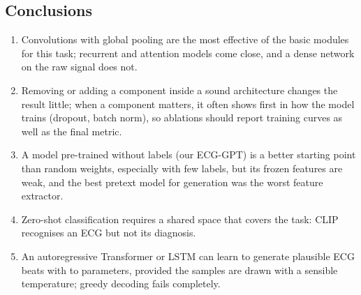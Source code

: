 \subsection{Conclusions}

\begin{enumerate}[leftmargin=1.4em,itemsep=1pt]
  \item Convolutions with global pooling are the most effective of the basic modules for this task;
        recurrent and attention models come close, and a dense network on the raw signal does not.
  \item Removing or adding a component inside a sound architecture changes the result little; when a
        component matters, it often shows first in how the model trains (dropout, batch norm), so
        ablations should report training curves as well as the final metric.
  \item A model pre-trained without labels (our ECG-GPT) is a better starting point than random weights,
        especially with few labels, but its frozen features are weak, and the best pretext model for
        generation was the worst feature extractor.
  \item Zero-shot classification requires a shared space that covers the task: CLIP recognises an ECG
        but not its diagnosis.
  \item An autoregressive Transformer or LSTM can learn to generate plausible ECG beats with
        \generativeParamsBase{} to \generativeParamsVocabTwoFiveSixZero{} parameters, provided the samples are drawn with a sensible temperature; greedy
        decoding fails completely.
\end{enumerate}
